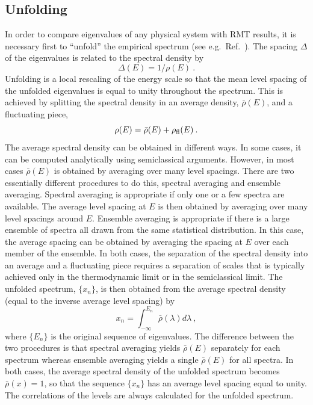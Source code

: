 \subsection{Unfolding}
\label{unfolding}

In order to compare eigenvalues of any physical system with RMT
results, it is necessary
first to ``unfold'' the empirical spectrum (see e.g.\
Ref.~\cite{Bohi84a}).  The spacing $\Delta$ of the eigenvalues is
related to the spectral density by
\begin{equation}
  \Delta(E)=1/\rho(E)\:.
\end{equation}
Unfolding is a local rescaling of the energy scale so that the mean
level spacing of the unfolded eigenvalues is equal to unity throughout
the spectrum.  This is achieved by splitting the spectral density in
an average density, $\bar \rho(E)$, and a fluctuating piece,
\begin{equation}
  \rho(E) = \bar \rho(E) + \rho_{\rm fl}(E)\:.
\end{equation}
The average spectral density can be obtained in different ways. In
some cases, it can be computed analytically using semiclassical
arguments.  However, in most cases $\bar \rho(E)$ is obtained by
averaging over many level spacings. There are two essentially
different procedures to do this, spectral averaging and ensemble
averaging.  Spectral averaging is appropriate if only one or a few spectra
are available. The average level spacing at $E$ is then obtained by
averaging over many level spacings around $E$.  Ensemble
averaging is appropriate if there is a large ensemble of spectra all
drawn from 
the same statistical distribution. In this case, the average spacing
can be obtained by averaging the spacing at $E$ over each member of
the ensemble.  In both cases, the separation of the spectral density
into an average and a fluctuating piece requires a separation of
scales that is typically achieved only in the thermodynamic limit or
in the semiclassical limit.  The unfolded spectrum, $\{x_n\}$, is then
obtained from the average spectral density (equal to the inverse
average level spacing) by
\begin{equation}
  x_n=\int_{-\infty}^{E_n}\bar\rho(\lambda) d\lambda\:,
\end{equation}
where $\{E_n\}$ is the original sequence of eigenvalues.  The
difference between the two procedures is that spectral averaging yields
$\bar\rho(E)$ separately for each spectrum whereas ensemble averaging
yields a single $\bar\rho(E)$ for all spectra.  In both cases, the
average spectral density of the unfolded spectrum becomes
$\bar\rho(x)=1$, so that the sequence $\{x_n\}$ has an average level
spacing equal to unity.  The correlations of the levels are always
calculated for the unfolded spectrum.

